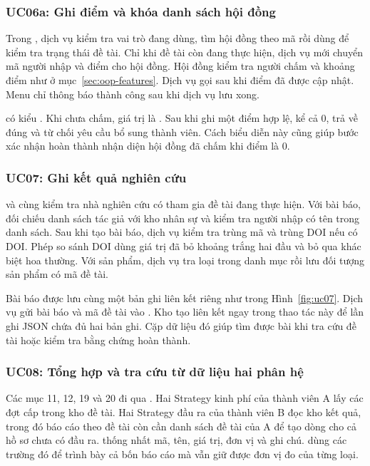 \subsubsection{UC06a: Ghi điểm và khóa danh sách hội đồng}

Trong , dịch vụ kiểm tra vai trò đang dùng, tìm hội đồng theo mã rồi dùng  để kiểm tra trạng thái đề tài. Chỉ khi đề tài còn đang thực hiện, dịch vụ mới chuyển mã người nhập và điểm cho hội đồng. Hội đồng kiểm tra người chấm và khoảng điểm như ở mục~\ref{sec:oop-features}. Dịch vụ gọi  sau khi điểm đã được cập nhật. Menu chỉ thông báo thành công sau khi dịch vụ lưu xong.

 có kiểu . Khi chưa chấm, giá trị là . Sau khi ghi một điểm hợp lệ, kể cả 0,  trả về đúng và  từ chối yêu cầu bổ sung thành viên. Cách biểu diễn này cũng giúp bước xác nhận hoàn thành nhận diện hội đồng đã chấm khi điểm là 0.

\subsubsection{UC07: Ghi kết quả nghiên cứu}

 và  cùng kiểm tra nhà nghiên cứu có tham gia đề tài đang thực hiện. Với bài báo,  đối chiếu danh sách tác giả với kho nhân sự và kiểm tra người nhập có tên trong danh sách. Sau khi  tạo bài báo, dịch vụ kiểm tra trùng mã và trùng DOI nếu có DOI. Phép so sánh DOI dùng giá trị đã bỏ khoảng trắng hai đầu và bỏ qua khác biệt hoa thường. Với sản phẩm, dịch vụ tra loại trong danh mục rồi lưu đối tượng sản phẩm có mã đề tài.

Bài báo được lưu cùng một bản ghi liên kết riêng như trong Hình~\ref{fig:uc07}. Dịch vụ gửi bài báo và mã đề tài vào . Kho tạo liên kết ngay trong thao tác này để lần ghi JSON chứa đủ hai bản ghi. Cặp dữ liệu đó giúp  tìm được bài khi tra cứu đề tài hoặc kiểm tra bằng chứng hoàn thành.

\subsubsection{UC08: Tổng hợp và tra cứu từ dữ liệu hai phân hệ}\label{sec:implementation-reporting}

Các mục 11, 12, 19 và 20 đi qua . Hai Strategy kinh phí của thành viên A lấy các đợt cấp trong kho đề tài. Hai Strategy đầu ra của thành viên B đọc kho kết quả, trong đó báo cáo theo đề tài còn cần danh sách đề tài của A để tạo dòng cho cả hồ sơ chưa có đầu ra.  thống nhất mã, tên, giá trị, đơn vị và ghi chú.  dùng các trường đó để trình bày cả bốn báo cáo mà vẫn giữ được đơn vị đo của từng loại.

